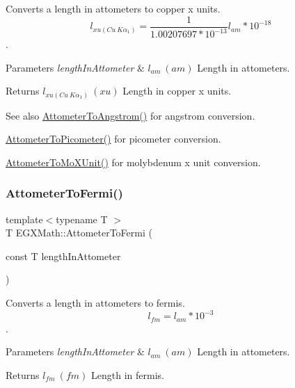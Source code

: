 Converts a length in attometers to copper x units. \[ l_{xu(Cu\ K\alpha_1)}= \frac{1}{1.00207697*10^{-13}} l_{am} * 10^{-18} \]. 


\begin{DoxyParams}{Parameters}
{\em length\+In\+Attometer} & $ l_{am}\ (am)$ Length in attometers. \\
\hline
\end{DoxyParams}
\begin{DoxyReturn}{Returns}
$ l_{xu(Cu\ K\alpha_1)}\ (xu)$ Length in copper x units. 
\end{DoxyReturn}
\begin{DoxySeeAlso}{See also}
\mbox{\hyperlink{group___e_g_x_math-_conversions-_length_conversions-_s_i-_attometer-_non-_s_i_ga331ff6e8159f6f00bb7a20e39fa4d756}{Attometer\+To\+Angstrom()}} for angstrom conversion. 

\mbox{\hyperlink{group___e_g_x_math-_conversions-_length_conversions-_s_i-_attometer-_s_i_ga46ccf47b501bffeb16bc792377e55991}{Attometer\+To\+Picometer()}} for picometer conversion. 

\mbox{\hyperlink{group___e_g_x_math-_conversions-_length_conversions-_s_i-_attometer-_non-_s_i_ga79ec6f4ec4a97af05fe8f69b80805ab7}{Attometer\+To\+Mo\+X\+Unit()}} for molybdenum x unit conversion. 
\end{DoxySeeAlso}
\mbox{\label{group___e_g_x_math-_conversions-_length_conversions-_s_i-_attometer-_non-_s_i_ga7dc342fa730e646b020d60aa6c2848ef}} 
\subsubsection{\texorpdfstring{Attometer\+To\+Fermi()}{AttometerToFermi()}}
{\footnotesize\ttfamily template$<$typename T $>$ \\
T E\+G\+X\+Math\+::\+Attometer\+To\+Fermi (\begin{DoxyParamCaption}\item[{const T}]{length\+In\+Attometer }\end{DoxyParamCaption})}



Converts a length in attometers to fermis. \[ l_{fm}=l_{am} * 10^{-3} \]. 


\begin{DoxyParams}{Parameters}
{\em length\+In\+Attometer} & $ l_{am}\ (am)$ Length in attometers. \\
\hline
\end{DoxyParams}
\begin{DoxyReturn}{Returns}
$ l_{fm}\ (fm)$ Length in fermis. 
\end{DoxyReturn}
\mbox{\label{group___e_g_x_math-_conversions-_length_conversions-_s_i-_attometer-_non-_s_i_ga9aaf945221fbc8d469121e0fd0980b41}} 
